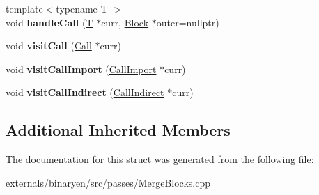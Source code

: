 \begin{DoxyCompactItemize}
\mbox{\label{structwasm_1_1_merge_blocks_a2aced228320a88ebfd6f6c361c1d6371}} 
{\footnotesize template$<$typename T $>$ }\\void {\bfseries handle\+Call} (\mbox{\hyperlink{struct_t}{T}} $\ast$curr, \mbox{\hyperlink{classwasm_1_1_block}{Block}} $\ast$outer=nullptr)
\item 
\mbox{\label{structwasm_1_1_merge_blocks_a8e2fe302202052500c32f53f18e8de76}} 
void {\bfseries visit\+Call} (\mbox{\hyperlink{classwasm_1_1_call}{Call}} $\ast$curr)
\item 
\mbox{\label{structwasm_1_1_merge_blocks_abbd7037dcf9efac595f6cb66dfd521c8}} 
void {\bfseries visit\+Call\+Import} (\mbox{\hyperlink{classwasm_1_1_call_import}{Call\+Import}} $\ast$curr)
\item 
\mbox{\label{structwasm_1_1_merge_blocks_a33b57be8c7cddf4334d2d120fea4e702}} 
void {\bfseries visit\+Call\+Indirect} (\mbox{\hyperlink{classwasm_1_1_call_indirect}{Call\+Indirect}} $\ast$curr)
\end{DoxyCompactItemize}
\subsection*{Additional Inherited Members}


The documentation for this struct was generated from the following file\+:\begin{DoxyCompactItemize}
\item 
externals/binaryen/src/passes/Merge\+Blocks.\+cpp\end{DoxyCompactItemize}
